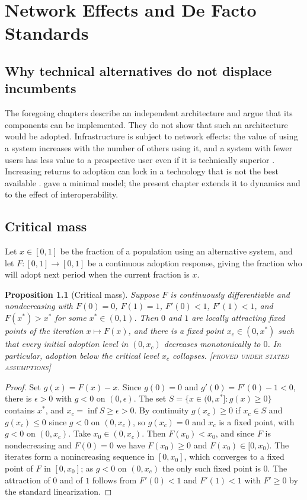 \documentclass[11pt,twoside,openright]{book}
\theoremstyle{plain}
\newtheorem{proposition}[theorem]{Proposition}
\theoremstyle{definition}
\theoremstyle{remark}
\newcommand{\Proved}{\textup{\textsc{[proved under stated assumptions]}}}
\begin{document}
\chapter{Network Effects and De Facto Standards}\label{ch:network}

\section{Why technical alternatives do not displace incumbents}

The foregoing chapters describe an independent architecture and argue that its components can be implemented. They do not show that such an architecture would be adopted. Infrastructure is subject to network effects: the value of using a system increases with the number of others using it, and a system with fewer users has less value to a prospective user even if it is technically superior \cite{katz1985}. Increasing returns to adoption can lock in a technology that is not the best available \cite{arthur1989}.  gave a minimal model; the present chapter extends it to dynamics and to the effect of interoperability.

\section{Critical mass}

Let $x\in[0,1]$ be the fraction of a population using an alternative system, and let $F:[0,1]\to[0,1]$ be a continuous adoption response, giving the fraction who will adopt next period when the current fraction is $x$.

\begin{proposition}[Critical mass]\label{prop:critmass}
Suppose $F$ is continuously differentiable and nondecreasing with $F(0)=0$, $F(1)=1$, $F'(0)<1$, $F'(1)<1$, and $F(x^*)>x^*$ for some $x^*\in(0,1)$. Then $0$ and $1$ are locally attracting fixed points of the iteration $x\mapsto F(x)$, and there is a fixed point $x_c\in(0,x^*)$ such that every initial adoption level in $(0,x_c)$ decreases monotonically to $0$. In particular, adoption below the critical level $x_c$ collapses.
\Proved{}
\end{proposition}

\begin{proof}
Set $g(x)=F(x)-x$. Since $g(0)=0$ and $g'(0)=F'(0)-1<0$, there is $\epsilon>0$ with $g<0$ on $(0,\epsilon)$. The set $S=\{x\in(0,x^*]:g(x)\ge0\}$ contains $x^*$, and $x_c=\inf S\ge\epsilon>0$. By continuity $g(x_c)\ge0$ if $x_c\in S$ and $g(x_c)\le 0$ since $g<0$ on $(0,x_c)$, so $g(x_c)=0$ and $x_c$ is a fixed point, with $g<0$ on $(0,x_c)$. Take $x_0\in(0,x_c)$. Then $F(x_0)<x_0$, and since $F$ is nondecreasing and $F(0)=0$ we have $F(x_0)\ge0$ and $F(x_0)\in[0,x_0)$. The iterates form a nonincreasing sequence in $[0,x_0]$, which converges to a fixed point of $F$ in $[0,x_0]$; as $g<0$ on $(0,x_c)$ the only such fixed point is $0$. The attraction of $0$ and of $1$ follows from $F'(0)<1$ and $F'(1)<1$ with $F'\ge0$ by the standard linearization.
\end{proof}
\end{document}
